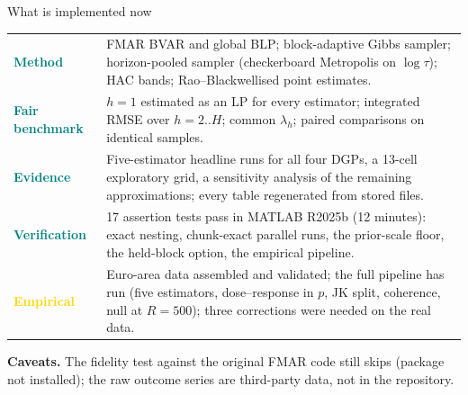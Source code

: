 \documentclass[aspectratio=169,11pt]{beamer}
\newcommand{\statusrow}[3]{%
  \textcolor{#1}{\bfseries #2} & #3\\[1.2mm]
}
\newcommand{\bigbox}[2]{%
  \colorbox{#1}{\parbox{0.955\textwidth}{\vspace{1.4mm}#2\vspace{1.4mm}}}}
\begin{document}
\begin{frame}{What is implemented now}
  \vspace{-1.5mm}
  {\fontsize{9.5}{11.4}\selectfont
  \renewcommand{\arraystretch}{1.0}
  \begin{tabularx}{\textwidth}{p{} X}
    \statusrow{Teal}{Method}{FMAR BVAR and global BLP; block-adaptive Gibbs sampler; horizon-pooled sampler (checkerboard Metropolis on $\log\tau$); HAC bands; Rao--Blackwellised point estimates.}
    \statusrow{Teal}{Fair benchmark}{$h=1$ estimated as an LP for every estimator; integrated RMSE over $h=2..H$; common $\lambda_h$; paired comparisons on identical samples.}
    \statusrow{Teal}{Evidence}{Five-estimator headline runs for all four DGPs, a 13-cell exploratory grid, a sensitivity analysis of the remaining approximations; every table regenerated from stored files.}
    \statusrow{Teal}{Verification}{17 assertion tests pass in MATLAB R2025b (12 minutes): exact nesting, chunk-exact parallel runs, the prior-scale floor, the held-block option, the empirical pipeline.}
    \statusrow{Gold}{Empirical}{Euro-area data assembled and validated; the full pipeline has run (five estimators, dose--response in $p$, JK split, coherence, null at $R=500$); three corrections were needed on the real data.}
  \end{tabularx}}
  \vspace{0.5mm}
  \bigbox{PaleOrange}{\fontsize{9}{11}\selectfont
      \textbf{Caveats.} The fidelity test against the original FMAR code still skips (package not installed); the raw outcome series are third-party data, not in the repository.}
\end{frame}
\end{document}
